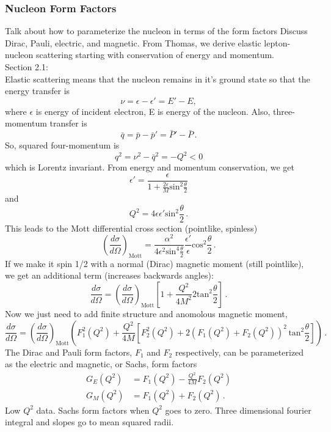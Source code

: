   \subsubsection{Nucleon Form Factors}
    Talk about how to parameterize the nucleon in terms of the form factors
    Discuss Dirac, Pauli, electric, and magnetic.
    From Thomas, we derive elastic lepton-nucleon scattering starting with
    conservation of energy and momentum. \\
    Section 2.1: \\
    Elastic scattering means that the nucleon remains in it's ground state so
    that the energy transfer is
    \[
        \nu = \epsilon - \epsilon' = E' - E,
     \]
    where $\epsilon$ is energy of incident electron, E is energy of the nucleon.
    Also, three-momentum transfer is
    \[
        \bar{q} = \bar{p} - \bar{p}' = \bar{P}' - \bar{P} \,.
    \]
    So, squared four-momentum is
    \[
        q^2 = \nu^2 - \bar{q}^2 = -Q^2 < 0
    \]
    which is Lorentz invariant.
    From energy and momentum conservation, we get
    \[
        \epsilon' = \frac{\epsilon}{1+\frac{2\epsilon}{M}\mathrm{sin}^2\frac{\theta}{2}}
    \]
    and
    \[
        Q^2 = 4\epsilon \epsilon' \mathrm{sin}^2 \frac{\theta}{2} \,.
    \]
    This leads to the Mott differential cross section (pointlike, spinless)
    \[
        \left(\frac{d\sigma}{d\Omega} \right)_\textrm{Mott} = \frac{\alpha^2}{4\epsilon^2 \textrm{sin}^4\frac{\theta}{2}}\frac{\epsilon'}{\epsilon}\textrm{cos}^2\frac{\theta}{2} \,.
    \]
    If we make it spin 1/2 with a normal (Dirac) magnetic moment (still pointlike), we get an additional term (increases backwards angles):
    \[
        \frac{d\sigma}{d\Omega} = \left(\frac{d\sigma}{d\Omega} \right)_\textrm{Mott} \left[ 1 + \frac{Q^2}{4M^2}2\mathrm{tan}^2\frac{\theta}{2} \right] \,.
    \]
    Now we just need to add finite structure and anomolous magnetic moment,
    \[
        \frac{d\sigma}{d\Omega} = \left(\frac{d\sigma}{d\Omega} \right)_\textrm{Mott} 
        \left(F_1^2(Q^2) +\frac{Q^2}{4M}\left[F_2^2(Q^2)+2(F_1(Q^2)+F_2(Q^2))^2\,\textrm{tan}^2\frac{\theta}{2} \right] \right) \,.
    \]
    The Dirac and Pauli form factors, $F_1$ and $F_2$ respectively, can be parameterized as the electric and magnetic, or Sachs, form factors
    \begin{align}
        G_E(Q^2) &= F_1(Q^2) - \frac{Q^2}{4M}F_2(Q^2) \\
        G_M(Q^2) &= F_1(Q^2) + F_2(Q^2) \,.
    \end{align}
    Low $Q^2$ data. Sachs form factors when $Q^2$ goes to zero. Three dimensional fourier integral and slopes go to mean squared radii.

